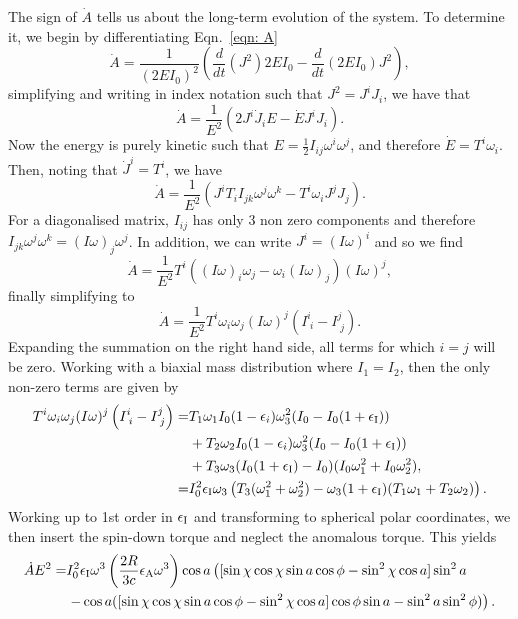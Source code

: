 \documentclass[../full_thesis/full_thesis.tex]{subfiles}
\begin{document}
The sign of $\dot{A}$ tells us about the long-term evolution of the system. To
determine it, we begin by differentiating Eqn.~\eqref{eqn: A}
\begin{equation}
\dot{A}=\frac{1}{(2EI_{0})^{2}}
        \left(\frac{d}{dt}(J^{2})2EI_{0}-\frac{d}{dt}(2EI_{0})J^{2}\right),
\end{equation}
simplifying and writing in index notation such that $J^{2}=J^iJ_i$, we have that
\begin{equation}
\dot{A}=\frac{1}{E^{2}}\left(2J^{i}\dot{J}_{i}E-\dot{E}J^{i}J_{i}\right).
\end{equation}
Now the energy is purely kinetic such that
$E=\frac{1}{2}I_{ij}\omega^{i}\omega^{j}$, and therefore $\dot{E}=T^{i}\omega_{i}$.
Then, noting that $\dot{J}^{i}=T^{i}$, we have
\begin{equation}
\dot{A}=\frac{1}{E^{2}}\left(J^{i}T_{i}I_{jk}\omega^{j}\omega^{k}
                             -T^{i}\omega_{i}J^{j}J_{j}\right).
\end{equation}
For a diagonalised matrix, $I_{ij}$ has only 3 non zero components and therefore
$I_{jk}\omega^{j}\omega^{k}=(I\omega)_{j}\omega^{j}$. In addition, we can write
$J^{i}=(I\omega)^{i}$ and so we find
\begin{equation}
\dot{A}=\frac{1}{E^{2}}T^{i}\left((I\omega)_{i}\omega_{j}
        -\omega_{i}(I\omega)_{j}\right)(I\omega)^{j},
\end{equation}
finally simplifying to
\begin{equation}
\dot{A}=\frac{1}{E^{2}}T^{i}\omega_{i}\omega_{j}
        (I\omega)^{j}\left(I^{i}_{\;i}-I^{j}_{\;j}\right).
\end{equation}
Expanding the
summation on the right hand side, all terms for which $i=j$ will be zero. Working with a biaxial mass
distribution where $I_{1}=I_{2}$, then the only non-zero terms are given by
\begin{align}
T^{i}\omega_{i}\omega_{j}(I\omega)^{j}\left(I^{i}_{\;i}-I^{j}_{\;j}\right) =&
T_{1}\omega_{1}I_{0}(1-\epsilon_{i})\omega^{2}_{3}
(I_{0}-I_{0}(1+\epsilon_{\mathrm{I}}))
\nonumber \\
 & + T_{2}\omega_{2}I_{0}(1-\epsilon_{i})\omega^{2}_{3}(I_{0}-I_{0}(1+\epsilon_{\mathrm{I}}))
\nonumber \\ 
& +
T_{3}\omega_{3}(I_{0}(1+\epsilon_{\mathrm{I}})-I_{0})
               (I_{0}\omega_{1}^{2}+I_{0}\omega_{2}^{2}), \\
=& I_{0}^{2}\epsilon_{\mathrm{I}}\omega_{3}\left(T_{3}(\omega_{1}^{2}+\omega_{2}^{2})
    - \omega_{3}(1+\epsilon_{\mathrm{I}})(T_{1}\omega_{1}+T_{2}\omega_{2})\right).
\end{align}
Working up to 1st order in $\epsilon_{\mathrm{I}}$ and transforming to spherical polar
coordinates, we then insert the spin-down torque and neglect the anomalous torque.
This yields
\begin{align}
\dot{A}E^{2} = & I_{0}^{2}\epsilon_{\mathrm{I}}\omega^{3}
    \left(\frac{2R}{3c}\epsilon_{\mathrm{A}}\omega^{3}\right)
    \cos a \left([\sin \chi \cos \chi \sin a \cos \phi
                 - \sin^{2}\chi \cos a]\sin^{2} a \right. \nonumber \\
& \left.- \cos a ([\sin \chi \cos \chi \sin a \cos \phi
                   - \sin^{2}\chi \cos a]\cos \phi \sin a
                   - \sin^{2}a \sin^{2}\phi)\right).
\end{align}
\end{document}
